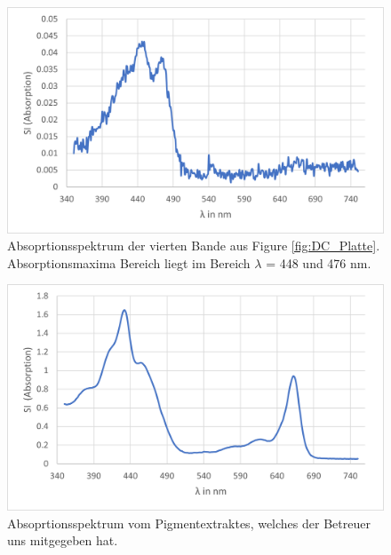 \documentclass[10pt,a4paper]{article}
\begin{document}
			\begin{figure}[H]
				\centering
				\includegraphics[scale=1]{fourthband.png}
				\caption{Absoprtionsspektrum der vierten Bande aus Figure \ref{fig:DC_Platte}. Absorptionsmaxima Bereich liegt im Bereich $\lambda$ = 448 und 476 nm.}
				\label{fig:vierte Bande}
			\end{figure}
			
			\begin{figure}[H]
				\centering
				\includegraphics[scale=1]{fifthband.png}
				\caption{Absoprtionsspektrum vom Pigmentextraktes, welches der Betreuer uns mitgegeben hat.}
				\label{fig:fünfte Bande}
			\end{figure}
			
\end{document}
